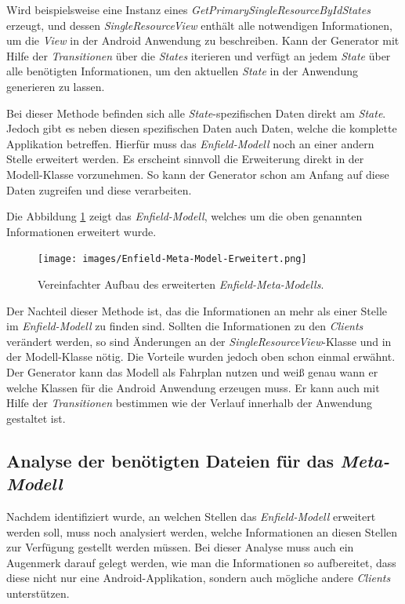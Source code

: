 Wird beispielsweise eine Instanz eines \textit{GetPrimarySingleResourceByIdStates} erzeugt, und dessen \textit{SingleResourceView} enthält alle notwendigen Informationen, um die \textit{View} in der Android Anwendung zu beschreiben. Kann der Generator mit Hilfe der \textit{Transitionen} über die \textit{States} iterieren und verfügt an jedem \textit{State} über alle benötigten Informationen, um den aktuellen \textit{State} in der Anwendung generieren zu lassen.

Bei dieser Methode befinden sich alle \textit{State}-spezifischen Daten direkt am \textit{State}. Jedoch gibt es neben diesen spezifischen Daten auch Daten, welche die komplette Applikation betreffen. Hierfür muss das \textit{Enfield-Modell} noch an einer andern Stelle erweitert werden. 
Es erscheint sinnvoll die Erweiterung direkt in der Modell-Klasse vorzunehmen. So kann der Generator schon am Anfang auf diese Daten zugreifen und diese verarbeiten.

Die Abbildung \ref{fig:enfield-model-extended} zeigt das \textit{Enfield-Modell}, welches um die oben genannten Informationen erweitert wurde.

\begin{figure}[H]
	\begin{center}
		\texttt{[image: images/Enfield-Meta-Model-Erweitert.png]}
		\caption{Vereinfachter Aufbau des erweiterten \textit{Enfield-Meta-Modells}.}
		\label{fig:enfield-model-extended}
	\end{center}
\end{figure}

Der Nachteil dieser Methode ist, das die Informationen an mehr als einer Stelle im \textit{Enfield-Modell} zu finden sind. Sollten die Informationen zu den \textit{Clients} verändert werden, so sind Änderungen an der \textit{SingleResourceView}-Klasse und in der Modell-Klasse nötig. Die Vorteile wurden jedoch oben schon einmal erwähnt. Der Generator kann das Modell als Fahrplan nutzen und weiß genau wann er welche Klassen für die Android Anwendung erzeugen muss. Er kann auch mit Hilfe der \textit{Transitionen} bestimmen wie der Verlauf innerhalb der Anwendung gestaltet ist.

\subsection{Analyse der benötigten Dateien für das \textit{Meta-Modell}}

Nachdem identifiziert wurde, an welchen Stellen das \textit{Enfield-Modell} erweitert werden soll, muss noch analysiert werden, welche Informationen an diesen Stellen zur Verfügung gestellt werden müssen. Bei dieser Analyse muss auch ein Augenmerk darauf gelegt werden, wie man die Informationen so aufbereitet, dass diese nicht nur eine Android-Applikation, sondern auch mögliche andere \textit{Clients} unterstützen.

